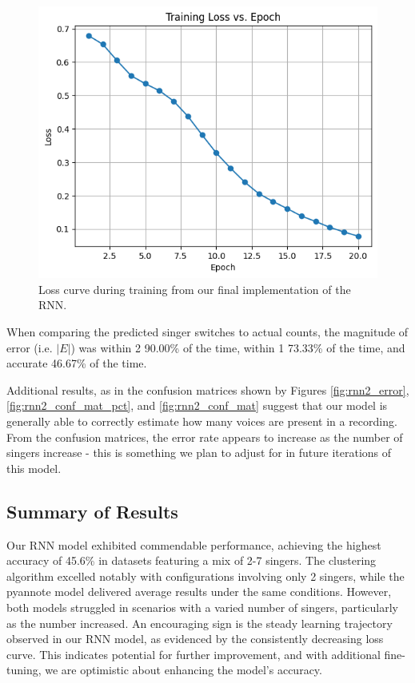 \documentclass[conference]{IEEEtran}
\begin{document}
    \begin{figure}[ht]
        \centering
        \includegraphics[scale=0.5]{RNN_Loss_v2.png}
        \caption{Loss curve during training from our final implementation of the RNN.}
        \label{fig:rnn_loss_v2}
    \end{figure}

    When comparing the predicted singer switches to actual counts, the magnitude of error (i.e. $|E|$) was within 2 90.00\% of the time, within 1 73.33\% of the time, and accurate 46.67\% of the time. 

    Additional results, as in the confusion matrices shown by Figures \ref{fig:rnn2_error}, \ref{fig:rnn2_conf_mat_pct}, and \ref{fig:rnn2_conf_mat} suggest that our model is generally able to correctly estimate how many voices are present in a recording. From the confusion matrices, the error rate appears to increase as the number of singers increase - this is something we plan to adjust for in future iterations of this model.

    \subsection{Summary of Results}
    Our RNN model exhibited commendable performance, achieving the highest accuracy of 45.6\% in datasets featuring a mix of 2-7 singers. The clustering algorithm excelled notably with configurations involving only 2 singers, while the pyannote model delivered average results under the same conditions. However, both models struggled in scenarios with a varied number of singers, particularly as the number increased. An encouraging sign is the steady learning trajectory observed in our RNN model, as evidenced by the consistently decreasing loss curve. This indicates potential for further improvement, and with additional fine-tuning, we are optimistic about enhancing the model's accuracy. 
\end{document}
